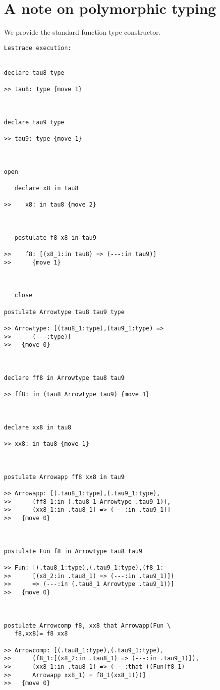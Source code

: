 \documentclass[12pt]{article}
\begin{document}
\section{A note on polymorphic typing}

We provide the standard function type constructor.

\begin{verbatim}Lestrade execution:


declare tau8 type

>> tau8: type {move 1}



declare tau9 type

>> tau9: type {move 1}



open

   declare x8 in tau8

>>    x8: in tau8 {move 2}



   postulate f8 x8 in tau9

>>    f8: [(x8_1:in tau8) => (---:in tau9)]
>>      {move 1}



   close

postulate Arrowtype tau8 tau9 type

>> Arrowtype: [(tau8_1:type),(tau9_1:type) =>
>>      (---:type)]
>>   {move 0}



declare ff8 in Arrowtype tau8 tau9

>> ff8: in (tau8 Arrowtype tau9) {move 1}



declare xx8 in tau8

>> xx8: in tau8 {move 1}



postulate Arrowapp ff8 xx8 in tau9

>> Arrowapp: [(.tau8_1:type),(.tau9_1:type),
>>      (ff8_1:in (.tau8_1 Arrowtype .tau9_1)),
>>      (xx8_1:in .tau8_1) => (---:in .tau9_1)]
>>   {move 0}



postulate Fun f8 in Arrowtype tau8 tau9

>> Fun: [(.tau8_1:type),(.tau9_1:type),(f8_1:
>>      [(x8_2:in .tau8_1) => (---:in .tau9_1)])
>>      => (---:in (.tau8_1 Arrowtype .tau9_1))]
>>   {move 0}



postulate Arrowcomp f8, xx8 that Arrowapp(Fun \
   f8,xx8)= f8 xx8

>> Arrowcomp: [(.tau8_1:type),(.tau9_1:type),
>>      (f8_1:[(x8_2:in .tau8_1) => (---:in .tau9_1)]),
>>      (xx8_1:in .tau8_1) => (---:that ((Fun(f8_1)
>>      Arrowapp xx8_1) = f8_1(xx8_1)))]
>>   {move 0}


\end{verbatim}
\end{document}
